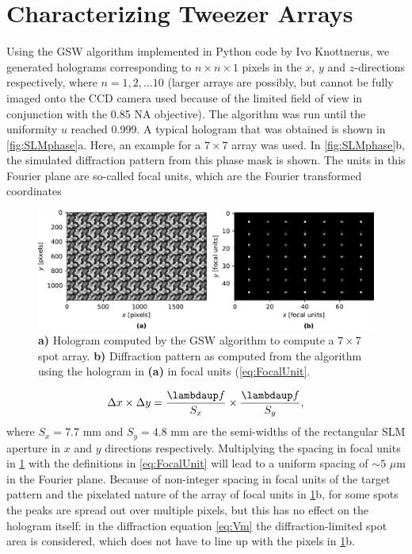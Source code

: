 \section{Characterizing Tweezer Arrays}\label{sec:ArraysResults}

Using the \ac{GSW} algorithm implemented in Python code by Ivo Knottnerus, we generated holograms corresponding to $n \times n \times 1$ pixels in the $x$, $y$ and $z$-directions respectively, where $n = 1,2,\ldots 10$ (larger arrays are possibly, but cannot be fully imaged onto the CCD camera used because of the limited field of view in conjunction with the 0.85 NA objective). 
The algorithm was run until the uniformity $u$ reached 0.999. 
A typical hologram that was obtained is shown in \cref{fig:SLMphase}a.
Here, an example for a $7 \times 7$ array was used. 
In \cref{fig:SLMphase}b, the simulated diffraction pattern from this phase mask is shown. 
The units in this Fourier plane are so-called focal units, which are the Fourier transformed coordinates \cite{Bijnen2015}



\begin{figure}
    \centering
    \includegraphics[width=\textwidth]{figures/MaskAndComputedPattern.pdf}
    \caption{\textsf{\textbf{a)}} Hologram computed by the \ac{GSW} algorithm to compute a $7\times7$ spot array.
    \textsf{\textbf{b)}} Diffraction pattern as computed from the algorithm using the hologram in \textsf{\textbf{(a)}} in focal units (\cref{eq:FocalUnit}.}
    \label{fig:HologramPattern}
\end{figure}

\begin{equation}\label{eq:FocalUnit}
    \Delta x \times \Delta y = \frac{\lambdaup f}{S_x}\times \frac{\lambdaup f}{S_y},
\end{equation}
where $S_x = 7.7$ mm and $S_y = 4.8$ mm are the semi-widths of the rectangular SLM aperture in $x$ and $y$ directions respectively.
Multiplying the spacing in focal units in \cref{fig:HologramPattern} with the definitions in \cref{eq:FocalUnit} will lead to a uniform spacing of $\sim 5$ $\mu$m in the Fourier plane. 
Because of non-integer spacing in focal units of the target pattern and the pixelated nature of the array of focal units in \ref{fig:HologramPattern}b, for some spots the peaks are spread out over multiple pixels, but this has no effect on the hologram itself: in the diffraction equation \cref{eq:Vm} the diffraction-limited spot area is considered, which does not have to line up with the pixels in \cref{fig:HologramPattern}b.

